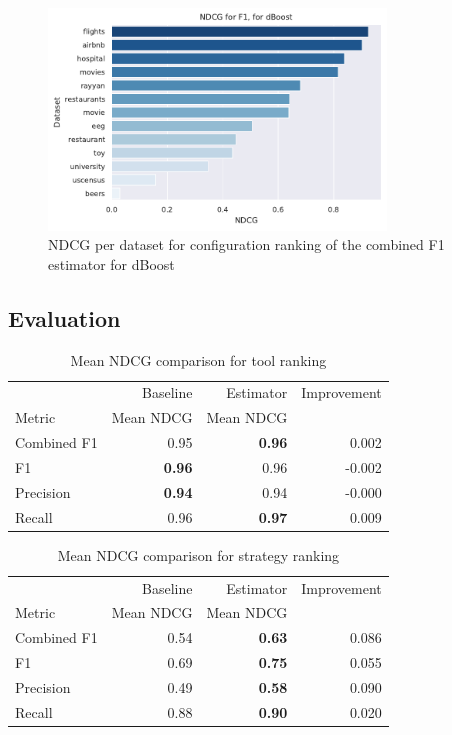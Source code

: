 \begin{figure}[H]
    \centering
    \includegraphics[width=0.8\textwidth]{thesis/Figures/RQ3/15_combined_profiler_NDCG_dBoost.pdf}
    \caption{NDCG per dataset for configuration ranking of the combined F1 estimator for dBoost}
    \label{fig:ndcg_per_config_dBoost}
\end{figure}


\subsection{Evaluation}

\begin{table}[h]
\centering
\caption{Mean NDCG comparison for tool ranking}
\begin{tabular}{lrrr}
\toprule
{} &  Baseline &       Estimator  &  Improvement \\
Metric      & Mean NDCG  &         Mean NDCG  &              \\
\midrule
Combined F1 &       0.95 &  \textbf{0.96} &     0.002 \\
F1          &       \textbf{0.96} &  0.96 &    -0.002 \\
Precision   &       \textbf{0.94} &  0.94 &    -0.000 \\
Recall      &       0.96 &  \textbf{0.97} &     0.009 \\
\bottomrule
\end{tabular}
\end{table}


\begin{table}[h]
\centering
\caption{Mean NDCG comparison for strategy ranking}
\begin{tabular}{lrrr}
\toprule
{} &  Baseline &       Estimator  &  Improvement \\
Metric      & Mean NDCG  &         Mean NDCG  &              \\
\midrule
Combined F1 &       0.54 &  \textbf{0.63} &     0.086 \\
F1          &       0.69 &  \textbf{0.75} &     0.055 \\
Precision   &       0.49 &  \textbf{0.58} &     0.090 \\
Recall      &       0.88 &  \textbf{0.90} &     0.020 \\
\bottomrule
\end{tabular}
\end{table}